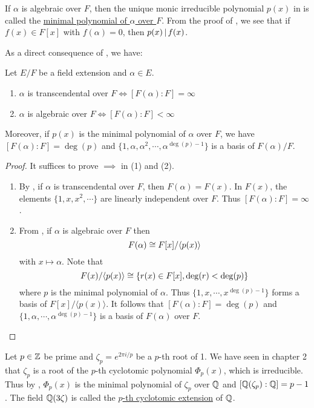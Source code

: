 \documentclass[11pt]{article}
\begin{document}
\begin{definition}
    If $\alpha$ is algebraic over $F$, then the unique monic irreducible polynomial $p(x)$ in  is called the \ul{minimal polynomial of $\alpha$ over $F$}. From the proof of , we see that if $f(x)\in F[x]$ with $f(\alpha)=0$, then $p(x)\,|\, f(x)$.
\end{definition}

As a direct consequence of , we have:

\begin{theorem}
    Let $E/F$ be a field extension and $\alpha\in E$.
    \begin{enumerate}
        \item $\alpha$ is transcendental over $F\iff[F(\alpha):F]=\infty$
        \item $\alpha$ is algebraic over $F\iff[F(\alpha):F]<\infty$
    \end{enumerate}
    Moreover, if $p(x)$ is the minimal polynomial of $\alpha$ over $F$, we have $[F(\alpha):F]=\deg(p)$ and $\{1,\alpha,\alpha^2,\cdots,\alpha^{\deg(p)-1}\}$ is a basis of $F(\alpha)/F$.
\end{theorem}

\begin{proof}
    It suffices to prove $\implies$ in (1) and (2).
    \begin{enumerate}
        \item By , if $\alpha$ is transcendental over $F$, then $F(\alpha)=F(x)$. In $F(x)$, the elements $\{1,x,x^2,\cdots\}$ are linearly independent over $F$. Thus $[F(\alpha):F]=\infty$.
        \item From , if $\alpha$ is algebraic over $F$ then
        \[F(\alpha)\cong F[x]/\langle p(x)\rangle\]
        with $x\mapsto\alpha$. Note that
        \[F(x)/\langle p(x)\rangle\cong\{r(x)\in F[x],\deg(r)<\deg(p)\}\]
        where $p$ is the minimal polynomial of $\alpha$. Thus $\{1,x,\cdots,x^{\deg(p)-1}\}$ forms a basis of $F[x]/\langle p(x)\rangle$. It follows that $[F(\alpha):F]=\deg(p)$ and $\{1,\alpha,\cdots,\alpha^{\deg(p)-1}\}$ is a basis of $F(\alpha)$ over $F$.
    \end{enumerate}
\end{proof}

\begin{example}
    Let $p\in\mathbb{Z}$ be prime and $\zeta_p=e^{2\pi i/p}$ be a $p$-th root of 1. We have seen in chapter 2 that $\zeta_p$ is a root of the $p$-th cyclotomic polynomial $\Phi_p(x)$, which is irreducible. Thus by , $\Phi_p(x)$ is the minimal polynomial of $\zeta_p$ over $\mathbb{Q}$ and $[\mathbb{Q}(\zeta_p):\mathbb{Q}]=p-1$. The field $\mathbb{Q}(3\zeta)$ is called the \ul{$p$-th cyclotomic extension} of $\mathbb{Q}$.
\end{example}
\end{document}
